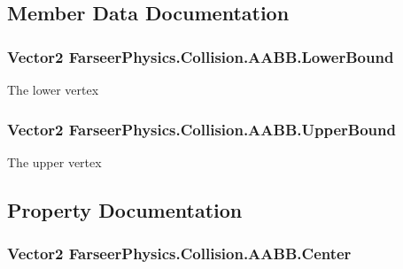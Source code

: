 \subsection{Member Data Documentation}
\hypertarget{struct_farseer_physics_1_1_collision_1_1_a_a_b_b_aa5a8a3782ec44c1ee419c19f8a5cb7d3}{
\subsubsection[{Lower\+Bound}]{\setlength{\rightskip}{0pt plus 5cm}Vector2 Farseer\+Physics.\+Collision.\+A\+A\+B\+B.\+Lower\+Bound}}\label{struct_farseer_physics_1_1_collision_1_1_a_a_b_b_aa5a8a3782ec44c1ee419c19f8a5cb7d3}


The lower vertex 

\hypertarget{struct_farseer_physics_1_1_collision_1_1_a_a_b_b_a8503a517e68256b9b18be9f88f609aba}{
\subsubsection[{Upper\+Bound}]{\setlength{\rightskip}{0pt plus 5cm}Vector2 Farseer\+Physics.\+Collision.\+A\+A\+B\+B.\+Upper\+Bound}}\label{struct_farseer_physics_1_1_collision_1_1_a_a_b_b_a8503a517e68256b9b18be9f88f609aba}


The upper vertex 



\subsection{Property Documentation}
\hypertarget{struct_farseer_physics_1_1_collision_1_1_a_a_b_b_abe9fe22280f3632a426c128a510c0a50}{
\subsubsection[{Center}]{\setlength{\rightskip}{0pt plus 5cm}Vector2 Farseer\+Physics.\+Collision.\+A\+A\+B\+B.\+Center\hspace{0.3cm}{\ttfamily [get]}}}\label{struct_farseer_physics_1_1_collision_1_1_a_a_b_b_abe9fe22280f3632a426c128a510c0a50}



